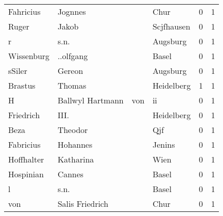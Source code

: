 \begin{center}
\begin{tiny}
\begin{longtabu}{llllrr}
                Fahricius &                            Jognnes &             &                                        Chur &          0 &         1 \\
                    Ruger &                              Jakob &             &                                  Scjfhausen &          0 &         1 \\
                        r &                               s.n. &             &                                    Augsburg &          0 &         1 \\
               Wissenburg &                          ..olfgang &             &                                       Basel &          0 &         1 \\
                   sSiler &                             Gereon &             &                                    Augsburg &          0 &         1 \\
                  Brastus &                             Thomas &             &                                  Heidelberg &          1 &         1 \\
                        H &                   Ballwyl Hartmann &         von &                                          ii &          0 &         1 \\
                Friedrich &                               III. &             &                                  Heidelberg &          0 &         1 \\
                     Beza &                            Theodor &             &                                         Qjf &          0 &         1 \\
                Fabricius &                           Hohannes &             &                                      Jenins &          0 &         1 \\
               Hoffhalter &                          Katharina &             &                                        Wien &          0 &         1 \\
                Hospinian &                             Cannes &             &                                       Basel &          0 &         1 \\
                        l &                               s.n. &             &                                       Basel &          0 &         1 \\
                      von &                    Salis Friedrich &             &                                        Chur &          0 &         1 \\

\end{longtabu}
\end{tiny}
\end{center}

